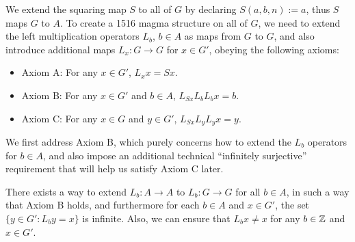 We extend the squaring map $S$ to all of $G$ by declaring $S(a,b,n) := a$, thus $S$ maps $G$ to $A$.  To create a 1516 magma structure on all of $G$, we need to extend the left multiplication operators $L_b$, $b \in A$ as maps from $G$ to $G$, and also introduce additional maps $L_x: G \to G$ for $x \in G'$, obeying the following axioms:
\begin{itemize}
\item Axiom A: For any $x \in G'$, $L_x x = Sx$.
\item Axiom B: For any $x \in G'$ and $b \in A$, $L_{Sx} L_b L_b x = b$.
\item Axiom C: For any $x \in G$ and $y \in G'$, $L_{Sx} L_y L_y x = y$.
\end{itemize}

We first address Axiom B, which purely concerns how to extend the $L_b$ operators for $b \in A$, and also impose an additional technical ``infinitely surjective'' requirement that will help us satisfy Axiom C later.

\begin{proposition}\label{axiom-b}  There exists a way to extend $L_b: A \to A$ to $L_b: G \to G$ for all $b \in A$, in such a way that Axiom B holds, and furthermore for each $b \in A$ and $x \in G'$, the set $\{ y \in G': L_b y = x \}$ is infinite. Also, we can ensure that $L_b x \neq x$ for any $b \in \mathbb{Z}$ and $x \in G'$.
\end{proposition}


